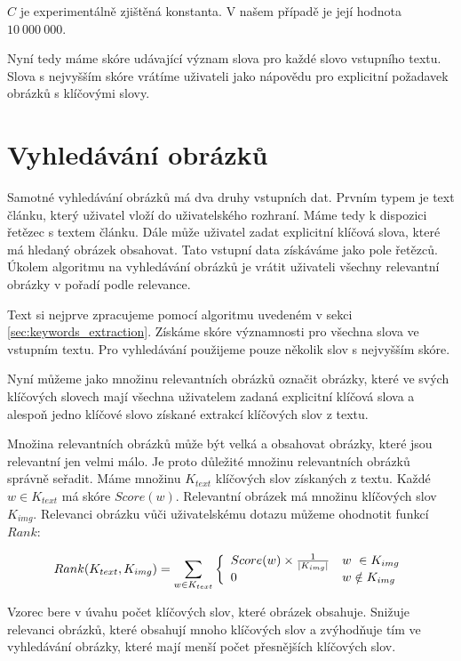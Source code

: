 $C$ je experimentálně zjištěná konstanta. V našem případě je její hodnota $10\ 000\ 000$.

Nyní tedy máme skóre udávající význam slova pro každé slovo vstupního textu. Slova s nejvyšším skóre vrátíme uživateli jako nápovědu pro explicitní požadavek obrázků s klíčovými slovy.


\section{Vyhledávání obrázků}

Samotné vyhledávání obrázků má dva druhy vstupních dat. Prvním typem je text článku, který uživatel vloží do uživatelského rozhraní. Máme tedy k dispozici řetězec s textem článku. Dále může uživatel zadat explicitní klíčová slova, které má hledaný obrázek obsahovat. Tato vstupní data získáváme jako pole řetězců. Úkolem algoritmu na vyhledávání obrázků je vrátit uživateli všechny relevantní obrázky v pořadí podle relevance.

Text si nejprve zpracujeme pomocí algoritmu uvedeném v sekci \ref{sec:keywords_extraction}. Získáme skóre významnosti pro všechna slova ve vstupním textu. Pro vyhledávání použijeme pouze několik slov s nejvyšším skóre.

Nyní můžeme jako množinu relevantních obrázků označit obrázky, které ve svých klíčových slovech mají všechna uživatelem zadaná explicitní klíčová slova a alespoň jedno klíčové slovo získané extrakcí klíčových slov z textu.

Množina relevantních obrázků může být velká a obsahovat obrázky, které jsou relevantní jen velmi málo. Je proto důležité množinu relevantních obrázků správně seřadit. Máme množinu $K_{text}$ klíčových slov získaných z textu. Každé $w \in K_{text}$ má skóre $Score(w)$. Relevantní obrázek má množinu klíčových slov $K_{img}$. Relevanci obrázku vůči uživatelskému dotazu můžeme ohodnotit funkcí $Rank$:

\begin{equation}
Rank(K_{text}, K_{img}) = \sum_{w \in K_{text}}{
  \left\{
  \begin{array}{l l} Score(w) \times \frac{1}{|K_{img}|} & w\ \in K_{img} \\
  0 & w \notin K_{img}
  \end{array}
  \right.
}
\end{equation}

Vzorec bere v úvahu počet klíčových slov, které obrázek obsahuje. Snižuje relevanci obrázků, které obsahují mnoho klíčových slov a zvýhodňuje tím ve vyhledávání obrázky, které mají menší počet přesnějších klíčových slov.




